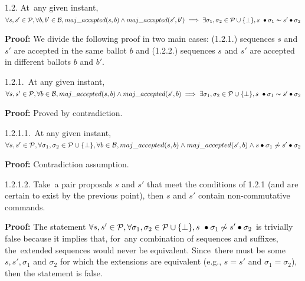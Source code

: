 \documentclass[algorithms,article,accept,moreauthors,pdftex,10pt,a4paper]{Definitions/mdpi}
\begin{document}
\indent\indent\indent\parbox{\linewidth-7mm-\algorithmicindent*3}{\strut1.2. At~any given instant, $\forall s,s' \in \mathcal{P},\forall b,b' \in \mathcal{B}, maj\_accepted(s,b) \land maj\_accepted(s',b') \implies \exists \sigma_1,\sigma_2 \in \mathcal{P} \cup \{\bot\}, s~\bullet \sigma_1 \thicksim s' \bullet \sigma_2$}\par
\indent\indent\indent\indent\parbox{\linewidth-9mm-\algorithmicindent*4}{\strut\textbf{Proof:} We divide the following proof in two main cases: (1.2.1.) sequences $s$ and $s'$ are accepted in the same ballot $b$ and (1.2.2.) sequences $s$ and $s'$ are accepted in different ballots $b$ and $b'$.}\par
\indent\indent\indent\indent\indent\parbox{\linewidth-11mm-\algorithmicindent*5}{\strut1.2.1.~At any given instant, $\forall s,s' \in \mathcal{P},\forall b \in \mathcal{B}, maj\_accepted(s,b) \land maj\_accepted(s',b) \implies \exists \sigma_1,\sigma_2 \in \mathcal{P} \cup \{\bot\}, s~\bullet \sigma_1 \thicksim s' \bullet \sigma_2$} \par
\indent\indent\indent\indent\indent\indent\parbox{\linewidth}{\strut\textbf{Proof:} Proved by contradiction.}\par
\indent\indent\indent\indent\indent\indent\indent\parbox{\linewidth-15.5mm-\algorithmicindent*7}{\strut1.2.1.1.~At any given instant, $\forall s,s' \in \mathcal{P}, \forall \sigma_1,\sigma_2 \in \mathcal{P} \cup \{\bot \},\forall b \in \mathcal{B}, maj\_accepted(s,b) \land maj\_accepted(s',b) \wedge s \bullet \sigma_1 \not\thicksim s' \bullet \sigma_2$} \par
\indent\indent\indent\indent\indent\indent\indent\indent\parbox{\linewidth}{\strut\textbf{Proof:} Contradiction assumption.}\par
\indent\indent\indent\indent\indent\indent\indent\parbox{\linewidth-15.5mm-\algorithmicindent*7}{\strut1.2.1.2. Take~a pair proposals $s$ and $s'$ that meet the conditions of 1.2.1 (and are certain to exist by the previous point), then $s$ and $s'$ contain non-commutative commands.}\par
\indent\indent\indent\indent\indent\indent\indent\indent\parbox{\linewidth-18mm-\algorithmicindent*8}{\strut\textbf{Proof:} The statement $\forall s,s' \in \mathcal{P}, \forall \sigma_1,\sigma_2 \in \mathcal{P} \cup \{\bot \}, s~\bullet \sigma_1 \not\thicksim s' \bullet \sigma_2$ is trivially false because it implies that, for~any combination of sequences and suffixes, the~extended sequences would never be equivalent. Since~there must be some $s,s',\sigma_1$ and $\sigma_2$ for which the extensions are equivalent (e.g., $s=s'$ and $\sigma_1=\sigma_2$), then the statement is false.}\par
\end{document}
